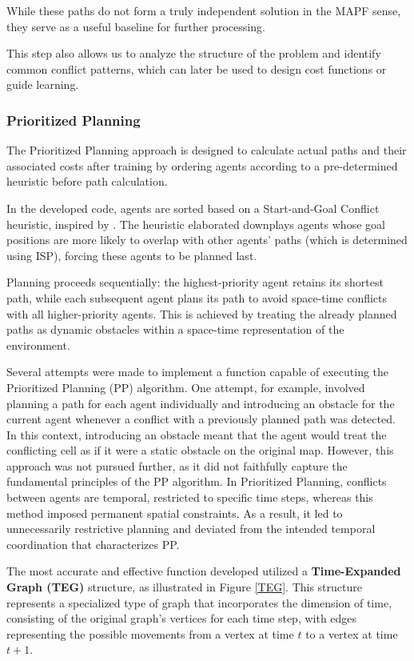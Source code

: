 While these paths do not form a truly independent solution in the MAPF sense, they serve as a useful baseline for further processing.

This step also allows us to analyze the structure of the problem and identify common conflict patterns, which can later be used to design cost functions or guide learning.

\subsubsection{Prioritized Planning}

The Prioritized Planning approach is designed to calculate actual paths and their associated costs after training by ordering agents according to a pre-determined heuristic before path calculation.

In the developed code, agents are sorted based on a Start-and-Goal Conflict heuristic, inspired by \cite{buckleyFastMotionPlanning1989}. The heuristic elaborated downplays agents whose goal positions are more likely to overlap with other agents' paths (which is determined using ISP), forcing these agents to be planned last.

Planning proceeds sequentially: the highest-priority agent retains its shortest path, while each subsequent agent plans its path to avoid space-time conflicts with all higher-priority agents. This is achieved by treating the already planned paths as dynamic obstacles within a space-time representation of the environment.

Several attempts were made to implement a function capable of executing the Prioritized Planning (PP) algorithm. One attempt, for example, involved planning a path for each agent individually and introducing an obstacle for the current agent whenever a conflict with a previously planned path was detected. In this context, introducing an obstacle meant that the agent would treat the conflicting cell as if it were a static obstacle on the original map. However, this approach was not pursued further, as it did not faithfully capture the fundamental principles of the PP algorithm. In Prioritized Planning, conflicts between agents are temporal, restricted to specific time steps, whereas this method imposed permanent spatial constraints. As a result, it led to unnecessarily restrictive planning and deviated from the intended temporal coordination that characterizes PP.

The most accurate and effective function developed utilized a \textbf{Time-Expanded Graph (TEG)} structure, as illustrated in Figure \ref{TEG}. This structure represents a specialized type of graph that incorporates the dimension of time, consisting of the original graph's vertices for each time step, with edges representing the possible movements from a vertex at time $ t $ to a vertex at time $ t+1 $.


